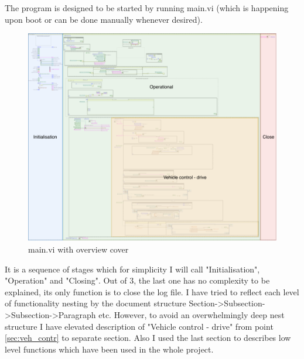 \def\visc{0.6}
\label{apx:doc}
The program is designed to be started by running main.vi (which is happening upon boot or can be done manually whenever desired).
\begin{figure}[!h]
    \centering
    \includegraphics[width=\textwidth]{figures/VI_over.pdf}
    \caption{main.vi with overview cover}
    \label{vi:main}
\end{figure}

It is a sequence of stages which for simplicity I will call "Initialisation", "Operation" and "Closing". Out of 3, the last one has no complexity to be explained, its only function is to close the log file. 
I have tried to reflect each level of functionality nesting by the document structure Section->Subsection->Subsection->Paragraph etc. However, to avoid an overwhelmingly deep nest structure I have elevated description of "Vehicle control - drive" from point \ref{sec:veh_contr} to separate section. Also I used the last section to describes low level functions which have been used in the whole project.

